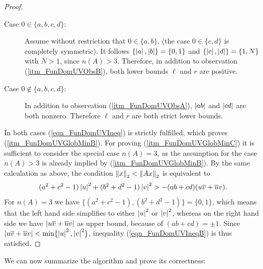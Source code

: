 \begin{proof}
\begin{description}
\item[Case $0 \in \{a,b,c,d\}$:] Assume without restriction that $0 \in \{a,b\}$, (the case $0 \in \{c,d\}$ is completely symmetric). It follows $\{\left|a\right|,\left|b\right|\} = \{0,1\}$ and $\{\left|c\right|,\left|d\right|\} = \{1,N\}$ with $N > 1$, since $n(A) > 3$. Therefore, in addition to observation (\ref{itm_FunDomUVObsB}), both lower bounds $\ell$ and $r$ are positive. 
\item[Case $0 \notin \{a,b,c,d\}$:] In addition to observation (\ref{itm_FunDomUVObsA}), $\left|ab\right|$ and $\left|cd\right|$ are both nonzero. Therefore $\ell$ and $r$ are both strict lower bounds.
\end{description}
In both cases (\ref{eqn_FunDomUVIneq}) is strictly fulfilled, which proves (\ref{itm_FunDomUVGlobMinB}). For proving (\ref{itm_FunDomUVGlobMinC}) it is sufficient to consider the special case $n(A) = 3$, as the assumption for the case $n(A) > 3$ is already implied by (\ref{itm_FunDomUVGlobMinB}). By the same calculation as above, the condition $\left\| x \right\|_2 < \left\| Ax \right\|_2$ is equivalent to
\begin{equation}
\label{eqn_FunDomUVIneqB}
(a^2 + c^2 - 1)\left|u\right|^2 + (b^2 + d^2 - 1)\left|v\right|^2 > -(ab + cd)(u\overline{v} + \overline{u}v).
\end{equation}
For $n(A) = 3$ we have $\{(a^2 + c^2 - 1),(b^2 + d^2 - 1)\} = \{0,1\}$, which means that the left hand side simplifies to either $\left|u\right|^2$ or $\left|v\right|^2$, whereas on the right hand side we have $\left|u\overline{v} + \overline{u}v\right|$ as upper bound, because of $(ab + cd) = \pm 1$. Since $\left|u\overline{v} + \overline{u}v\right| < \min\{\left|u\right|^2,\left|v\right|^2\}$, inequality (\ref{eqn_FunDomUVIneqB}) is thus satisfied.
\end{proof}

We can now summarize the algorithm and prove its correctness:

